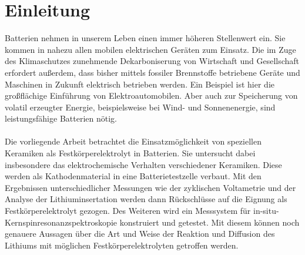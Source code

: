 \documentclass[a4paper, 11pt, headsepline,footsepline,twoside,abstract]{scrbook}
\begin{document}
\chapter{Einleitung}
Batterien nehmen in unserem Leben einen immer höheren Stellenwert ein. Sie kommen in nahezu allen mobilen elektrischen Geräten zum Einsatz. Die im Zuge des Klimaschutzes zunehmende Dekarboniserung von Wirtschaft und Gesellschaft erfordert außerdem, dass bisher mittels fossiler Brennstoffe betriebene Geräte und Maschinen in Zukunft elektrisch betrieben werden. Ein Beispiel ist hier die großflächige Einführung von Elektroautomobilen. Aber auch zur Speicherung von volatil erzeugter Energie, beispielsweise bei Wind- und Sonnenenergie, sind leistungsfähige Batterien nötig.
\\\\
%
Die vorliegende Arbeit betrachtet die Einsatzmöglichkeit von speziellen Keramiken als Festkörperelektrolyt in Batterien. Sie untersucht dabei insbesondere das elektrochemische Verhalten verschiedener Keramiken. Diese werden als Kathodenmaterial in eine Batterietestzelle verbaut. Mit den Ergebnissen unterschiedlicher Messungen wie der zyklischen Voltametrie und der Analyse der Lithiuminsertation werden dann Rückschlüsse auf die Eignung als Festkörperelektrolyt gezogen. Des Weiteren wird ein Messsystem für in-situ-Kernspinresonanzspektroskopie konstruiert und getestet. Mit diesem können noch genauere Aussagen über die Art und Weise der Reaktion und Diffusion des Lithiums mit möglichen Festkörperelektrolyten getroffen werden.
\end{document}
